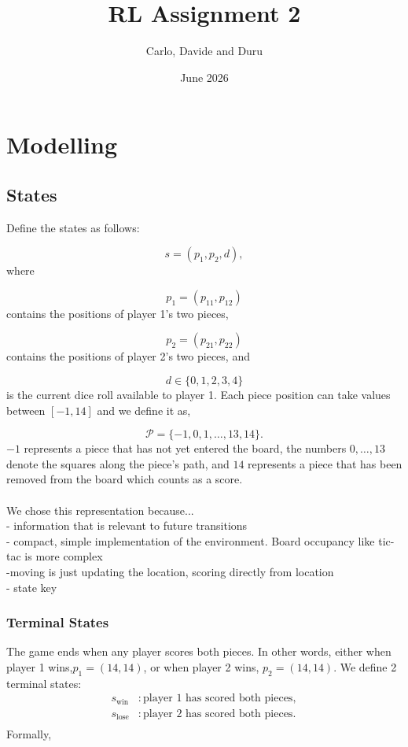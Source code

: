 \documentclass{article}
\title{RL Assignment 2}
\author{Carlo, Davide and Duru}
\date{June 2026}
\begin{document}
\maketitle
\section{Modelling}
\subsection{States}
Define the states as follows:

\[
s=(p_1,p_2,d),
\]
where

\[
p_1=(p_{11},p_{12})
\]
contains the positions of player 1's two pieces,

\[
p_2=(p_{21},p_{22})
\]
contains the positions of player 2's two pieces, and

\[
d\in\{0,1,2,3,4\}
\]
is the current dice roll available to player 1. Each piece position can take values between $[-1,14]$ and we define it as,

\[
\mathcal P=
\{-1,0,1,\ldots,13,14\}.
\]
$-1$ represents a piece that has not yet entered the board, the numbers $0,\ldots,13$ denote the squares along the piece's path, and $14$ represents a piece that has been removed from the board which counts as a score.
\\
\\
We chose this representation because...\\
- information that is relevant to future transitions\\
- compact, simple implementation of the environment. Board occupancy like tic-tac is more complex \\
-moving is just updating the location, scoring directly from location\\
- state key\\

\subsubsection{Terminal States}
The game ends when any player scores both pieces. In other words, either when player 1 wins,$p_1=(14,14)$, or when player 2 wins, $p_2=(14,14)$. We define 2 terminal states:
\begin{align*}
s_{\text{win}} & : \text{player 1 has scored both pieces},\\
s_{\text{lose}} & : \text{player 2 has scored both pieces}.\\
\end{align*}
Formally,
\end{document}
